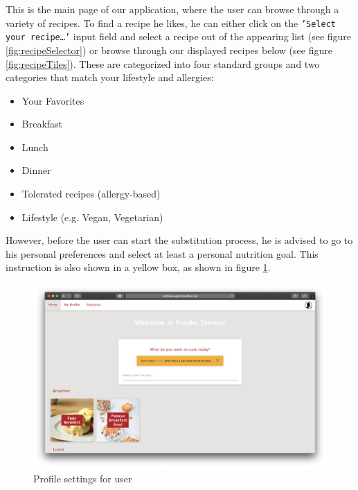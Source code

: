 This is the main page of our application, where the user can browse through a variety of recipes. To find a recipe he likes, he can either click on the \texttt{'Select your recipe…'} input field and select a recipe out of the appearing list (see figure \ref{fig:recipeSelector}) or browse through our displayed recipes below (see figure \ref{fig:recipeTiles}). These are categorized into four standard groups and two categories that match your lifestyle and allergies:
\clearpage
\begin{itemize}
\item Your Favorites
\item Breakfast
\item Lunch
\item Dinner
\item Tolerated recipes (allergy-based)
\item Lifestyle (e.g. Vegan, Vegetarian)
\end{itemize}	
However, before the user can start the substitution process, he is advised to go to his personal preferences and select at least a personal nutrition goal. This instruction is also shown in a yellow box, as shown in figure \ref{fig:profilesetting}.

\vspace{-1em}
\begin{figure}[H]
	\captionsetup{justification=centering}
	\centering
	\includegraphics[scale=0.30]{Ressourcen/img/screenshots/screenshot41.png}
	\vspace{-3em}
	\caption{Profile settings for user}
	\label{fig:profilesetting}
\end{figure}


